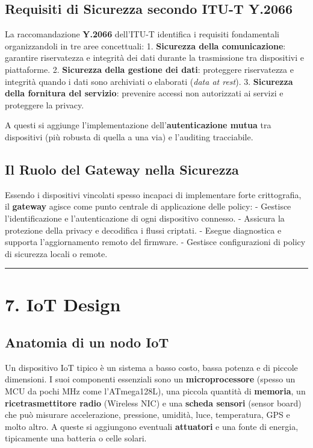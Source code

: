 \documentclass[
  italian,
  openany]{book}
\begin{document}
\subsection{Requisiti di Sicurezza secondo ITU-T
Y.2066}\label{requisiti-di-sicurezza-secondo-itu-t-y.2066}

La raccomandazione \textbf{Y.2066} dell'ITU-T identifica i requisiti
fondamentali organizzandoli in tre aree concettuali: 1.
\textbf{Sicurezza della comunicazione}: garantire riservatezza e
integrità dei dati durante la trasmissione tra dispositivi e
piattaforme. 2. \textbf{Sicurezza della gestione dei dati}: proteggere
riservatezza e integrità quando i dati sono archiviati o elaborati
(\emph{data at rest}). 3. \textbf{Sicurezza della fornitura del
servizio}: prevenire accessi non autorizzati ai servizi e proteggere la
privacy.

A questi si aggiunge l'implementazione dell'\textbf{autenticazione
mutua} tra dispositivi (più robusta di quella a una via) e l'auditing
tracciabile.

\subsection{Il Ruolo del Gateway nella
Sicurezza}\label{il-ruolo-del-gateway-nella-sicurezza}

Essendo i dispositivi vincolati spesso incapaci di implementare forte
crittografia, il \textbf{gateway} agisce come punto centrale di
applicazione delle policy: - Gestisce l'identificazione e
l'autenticazione di ogni dispositivo connesso. - Assicura la protezione
della privacy e decodifica i flussi criptati. - Esegue diagnostica e
supporta l'aggiornamento remoto del firmware. - Gestisce configurazioni
di policy di sicurezza locali o remote.

\begin{center}\rule{0.5\linewidth}{0.5pt}\end{center}

\section{7. IoT Design}\label{iot-design}

\subsection{Anatomia di un nodo IoT}\label{anatomia-di-un-nodo-iot}

Un dispositivo IoT tipico è un sistema a basso costo, bassa potenza e di
piccole dimensioni. I suoi componenti essenziali sono un
\textbf{microprocessore} (spesso un MCU da pochi MHz come l'ATmega128L),
una piccola quantità di \textbf{memoria}, un \textbf{ricetrasmettitore
radio} (Wireless NIC) e una \textbf{scheda sensori} (sensor board) che
può misurare accelerazione, pressione, umidità, luce, temperatura, GPS e
molto altro. A queste si aggiungono eventuali \textbf{attuatori} e una
fonte di energia, tipicamente una batteria o celle solari.
\end{document}
